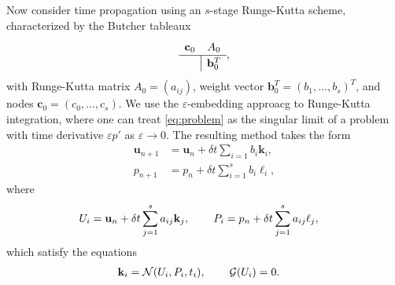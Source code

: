 \documentclass[a4paper,10pt]{article}
\begin{document}
Now consider time propagation using an $s$-stage Runge-Kutta scheme,
characterized by the Butcher tableaux 
%
\begin{align*}
	\renewcommand\arraystretch{1.2}
	\begin{array}
	{c|c}
	\mathbf{c}_0 & A_0\\
	\hline
	& \mathbf{b}_0^T
	\end{array},
\end{align*}
%
with Runge-Kutta matrix $A_0 = (a_{ij})$, weight vector $\mathbf{b}_0^T =
(b_1, \ldots, b_s)^T$, and nodes $\mathbf{c}_0 = (c_0, \ldots, c_s)$. We use
the $\varepsilon$-embedding approacg to Runge-Kutta integration, where one can
treat \eqref{eq:problem} as the singular limit of a problem with time
derivative $\varepsilon p'$ as $\varepsilon \to 0$. The resulting method
takes the form
%
\begin{align*}
\mathbf{u}_{n+1} & = \mathbf{u}_n + \delta t \sum_{i=1} b_i\mathbf{k}_i, \\
p_{n+1} & = p_n + \delta t \sum_{i=1}^s b_i{\ell}_i,
\end{align*}
%
where 
%
\begin{align}\label{eq:UP}
U_i & = \mathbf{u}_n + \delta t\sum_{j=1}^s a_{ij} \mathbf{k}_j, \hspace{5ex}
P_i = p_n + \delta t\sum_{j=1}^s a_{ij} \ell_j,
\end{align}
%
which satisfy the equations
%
\begin{align}\label{eq:kl}
\mathbf{k}_i & = \mathcal{N}(U_i,P_i, t_i), \hspace{5ex} \mathcal{G}(U_i) = 0.
\end{align}
%
\end{document}
